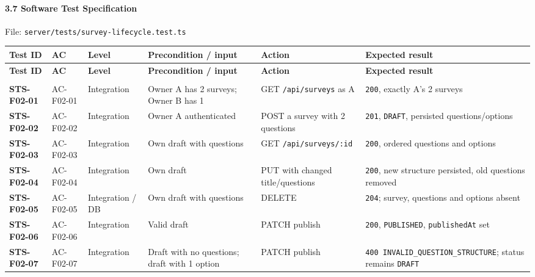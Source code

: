 \documentclass[12pt,a4paper]{article}
\begin{document}
\paragraph*{3.7 Software Test Specification}
File: \texttt{server/tests/survey-lifecycle.test.ts}

{\setlength{\tabcolsep}{3pt}\renewcommand{\arraystretch}{1.08}\scriptsize
\begin{longtable}{@{}>{\raggedright\arraybackslash}p{}>{\raggedright\arraybackslash}p{}>{\raggedright\arraybackslash}p{}>{\raggedright\arraybackslash}p{}>{\raggedright\arraybackslash}p{}>{\raggedright\arraybackslash}p{}@{}}
\toprule
\textbf{Test ID} & \textbf{AC} & \textbf{Level} & \textbf{Precondition / input} & \textbf{Action} & \textbf{Expected result} \\
\midrule
\endfirsthead
\toprule
\textbf{Test ID} & \textbf{AC} & \textbf{Level} & \textbf{Precondition / input} & \textbf{Action} & \textbf{Expected result} \\
\midrule
\endhead
\midrule
\multicolumn{6}{r}{\footnotesize\textit{Continued on next page}}\\
\endfoot
\bottomrule
\endlastfoot
\textbf{STS-F02-01} & AC-F02-01 & Integration & Owner A has 2 surveys; Owner B has 1 & GET \texttt{/api/surveys} as A & \texttt{200}, exactly A's 2 surveys \\
\textbf{STS-F02-02} & AC-F02-02 & Integration & Owner A authenticated & POST a survey with 2 questions & \texttt{201}, \texttt{DRAFT}, persisted questions/options \\
\textbf{STS-F02-03} & AC-F02-03 & Integration & Own draft with questions & GET \texttt{/api/surveys/:id} & \texttt{200}, ordered questions and options \\
\textbf{STS-F02-04} & AC-F02-04 & Integration & Own draft & PUT with changed title/questions & \texttt{200}, new structure persisted, old questions removed \\
\textbf{STS-F02-05} & AC-F02-05 & Integration / DB & Own draft with questions & DELETE & \texttt{204}; survey, questions and options absent \\
\textbf{STS-F02-06} & AC-F02-06 & Integration & Valid draft & PATCH publish & \texttt{200}, \texttt{PUBLISHED}, \texttt{publishedAt} set \\
\textbf{STS-F02-07} & AC-F02-07 & Integration & Draft with no questions; draft with 1 option & PATCH publish & \texttt{400 INVALID\_QUESTION\_STRUCTURE}; status remains \texttt{DRAFT} \\

\end{longtable}}
\end{document}
